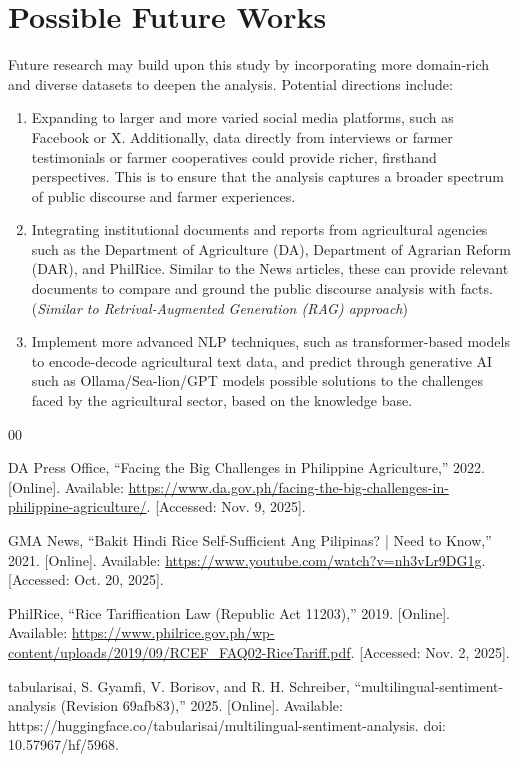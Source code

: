 \documentclass[conference]{IEEEtran}
\begin{document}
\section{Possible Future Works}

Future research may build upon this study by incorporating more domain-rich and diverse datasets to deepen the analysis. Potential directions include:
\begin{enumerate}
    \item Expanding to larger and more varied social media platforms, such as Facebook or X. Additionally, data directly from interviews or farmer testimonials or farmer cooperatives could provide richer, firsthand perspectives. This is to ensure that the analysis captures a broader spectrum of public discourse and farmer experiences.
    \item Integrating institutional documents and reports from agricultural agencies such as the Department of Agriculture (DA), Department of Agrarian Reform (DAR), and PhilRice. Similar to the News articles, these can provide relevant documents to compare and ground the public discourse analysis with facts. (\textit{Similar to Retrival-Augmented Generation (RAG) approach})
    \item Implement more advanced NLP techniques, such as transformer-based models to encode-decode agricultural text data, and predict through generative AI such as Ollama/Sea-lion/GPT models possible solutions to the challenges faced by the agricultural sector, based on the knowledge base.
\end{enumerate}

\sloppy

\newpage \begin{thebibliography}{00}

DA Press Office, ``Facing the Big Challenges in Philippine Agriculture,'' 2022. [Online]. Available: \url{https://www.da.gov.ph/facing-the-big-challenges-in-philippine-agriculture/}. [Accessed: Nov. 9, 2025].

GMA News, ``Bakit Hindi Rice Self-Sufficient Ang Pilipinas? | Need to Know,'' 2021. [Online]. Available: \url{https://www.youtube.com/watch?v=nh3vLr9DG1g}. [Accessed: Oct. 20, 2025].

PhilRice, ``Rice Tariffication Law (Republic Act 11203),'' 2019. [Online]. Available: \url{https://www.philrice.gov.ph/wp-content/uploads/2019/09/RCEF_FAQ02-RiceTariff.pdf}. [Accessed: Nov. 2, 2025].

tabularisai, S. Gyamfi, V. Borisov, and R. H. Schreiber, “multilingual-sentiment-analysis (Revision 69afb83),” 2025. [Online]. Available: https://huggingface.co/tabularisai/multilingual-sentiment-analysis. doi: 10.57967/hf/5968.

\end{thebibliography}
\end{document}
